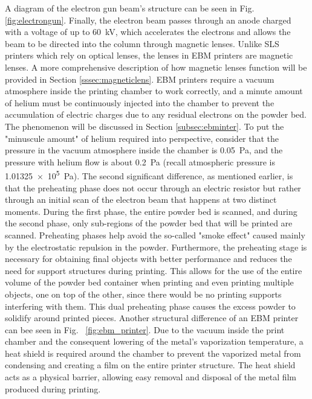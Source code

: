A diagram of the electron gun beam's structure can be seen in Fig. \ref{fig:electrongun}. Finally, the electron beam passes through an anode charged with a voltage of up to \SI{60}{\kilo\volt}, which accelerates the electrons and allows the beam to be directed into the column through magnetic lenses. Unlike SLS printers which rely on optical lenses, the lenses in EBM printers are magnetic lenses. A more comprehensive description of how magnetic lenses function will be provided in Section \ref{sssec:magneticlens}. EBM printers require a vacuum atmosphere inside the printing chamber to work correctly, and a minute amount of helium must be continuously injected into the chamber to prevent the accumulation of electric charges due to any residual electrons on the powder bed. The phenomenon will be discussed in Section \ref{subsec:ebminter}. To put the "minuscule amount" of helium required into perspective, consider that the pressure in the vacuum atmosphere inside the chamber is \SI{0.05}{\pascal}, and the pressure with helium flow is about \SI{0,2}{\pascal} (recall atmospheric pressure is \SI{1,01325e5}{\pascal}). The second significant difference, as mentioned earlier, is that the preheating phase does not occur through an electric resistor but rather through an initial scan of the electron beam that happens at two distinct moments. During the first phase, the entire powder bed is scanned, and during the second phase, only sub-regions of the powder bed that will be printed are scanned. Preheating phases help avoid the so-called "smoke effect" caused mainly by the electrostatic repulsion in the powder. Furthermore, the preheating stage is necessary for obtaining final objects with better performance and reduces the need for support structures during printing. This allows for the use of the entire volume of the powder bed container when printing and even printing multiple objects, one on top of the other, since there would be no printing supports interfering with them. This dual preheating phase causes the excess powder to solidify around printed pieces. Another structural difference of an EBM printer can bee seen in Fig. ~\ref{fig:ebm_printer}. Due to the vacuum inside the print chamber and the consequent lowering of the metal's vaporization temperature, a heat shield is required around the chamber to prevent the vaporized metal from condensing and creating a film on the entire printer structure. The heat shield acts as a physical barrier, allowing easy removal and disposal of the metal film produced during printing.
